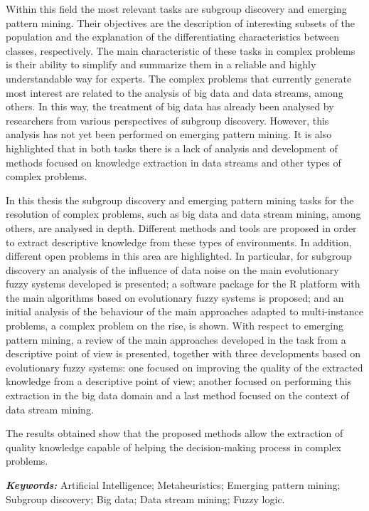 \documentclass[c5paper,10pt,twoside]{book}	   	%
\begin{document}
Within this field the most relevant tasks are subgroup discovery and emerging pattern mining. Their objectives are the description of interesting subsets of the population and the explanation of the differentiating characteristics between classes, respectively. The main characteristic of these tasks in complex problems is their ability to simplify and summarize them in a reliable and highly understandable way for experts. The complex problems that currently generate most interest are related to the analysis of big data and data streams, among others. In this way, the treatment of big data has already been analysed by researchers from various perspectives of subgroup discovery. However, this analysis has not yet been performed on emerging pattern mining. It is also highlighted that in both tasks there is a lack of analysis and development of methods focused on knowledge extraction in data streams and other types of complex problems.

In this thesis the subgroup discovery and emerging pattern mining tasks for the resolution of complex problems, such as big data and data stream mining, among others, are analysed in depth. Different methods and tools are proposed in order to extract descriptive knowledge from these types of environments. In addition, different open problems in this area are highlighted. In particular, for subgroup discovery an analysis of the influence of data noise on the main evolutionary fuzzy systems developed is presented; a software package for the R platform with the main algorithms based on evolutionary fuzzy systems is proposed; and an initial analysis of the behaviour of the main approaches adapted to multi-instance problems, a complex problem on the rise, is shown. With respect to emerging pattern mining, a review of the main approaches developed in the task from a descriptive point of view is presented, together with three developments based on evolutionary fuzzy systems: one focused on improving the quality of the extracted knowledge from a descriptive point of view; another focused on performing this extraction in the big data domain and a last method focused on the context of data stream mining.

The results obtained show that the proposed methods allow the extraction of quality knowledge capable of helping the decision-making process in complex problems.

\vspace{7.5mm}

\textbf{\textit{Keywords: }} Artificial Intelligence; Metaheuristics; Emerging pattern mining; Subgroup discovery; Big data; Data stream mining; Fuzzy logic.\clearpage{} \cleardoublepage
\end{document}
